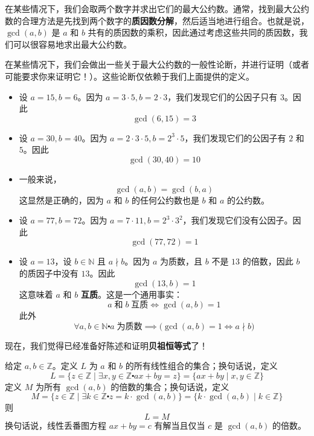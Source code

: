\begin{example}
    在某些情况下，我们会取两个数字并求出它们的最大公约数。通常，找到最大公约数的合理方法是先找到两个数字的\textbf{质因数分解}，然后适当地进行组合。也就是说，$\gcd(a, b)$ 是 $a$ 和 $b$ 共有的质因数的乘积，因此通过考虑这些共同的质因数，我们可以很容易地求出最大公约数。

    在某些情况下，我们会做出一些关于最大公约数的一般性论断，并进行证明（或者可能要求你来证明它！）。这些论断仅依赖于我们上面提供的定义。

    \begin{itemize}
        \item 设 $a=15, b=6$。因为 $a = 3 \cdot 5, b = 2 \cdot 3$，我们发现它们的公因子只有 $3$。因此
            \[\gcd(6, 15) = 3\]
        \item 设 $a=30, b=40$。因为 $a = 2 \cdot 3 \cdot 5, b = 2^3 \cdot 5$，我们发现它们的公因子有 $2$ 和 $5$。因此
            \[\gcd(30, 40) = 10\]
        \item 一般来说，
            \[\gcd(a, b) = \gcd(b, a)\]
            这显然是正确的，因为 $a$ 和 $b$ 的任何公约数也是 $b$ 和 $a$ 的公约数。
        \item 设 $a=77, b=72$。因为 $a = 7 \cdot 11, b = 2^3 \cdot 3^2$，我们发现它们没有公因子。因此
            \[\gcd(77, 72) = 1\]
        \item 设 $a=13$，设 $b \in \mathbb{N}$ 且 $a \nmid b$。因为 $a$ 为质数，且 $b$ 不是 $13$ 的倍数，因此 $b$ 的质因子中没有 $13$。因此
            \[\gcd(13, b) = 1\]
            这意味着 $a$ 和 $b$ \textbf{互质}。这是一个通用事实：
            \[a \;\text{和}\; b \;\text{互质} \iff \gcd(a, b) = 1\]
            此外
            \[\forall a, b \in \mathbb{N} \centerdot a \;\text{为质数} \implies \big(\gcd(a,b)=1 \iff a \nmid b\big)\]
    \end{itemize}
\end{example}

现在，我们觉得已经准备好陈述和证明\textbf{贝祖恒等式}了！

\begin{theorem}[贝祖恒等式]\label{theorem6.5.31}
   给定 $a, b \in \mathbb{Z}$。定义 $L$ 为 $a$ 和 $b$ 的所有线性组合的集合；换句话说，定义
   \[L = \{z \in \mathbb{Z} \mid \exists x, y \in \mathbb{Z} \centerdot ax + by = z\} = \{ax + by \mid x, y \in \mathbb{Z}\}\]
   定义 $M$ 为所有 $\gcd(a, b)$ 的倍数的集合；换句话说，定义
   \[M = \{z \in \mathbb{Z} \mid \exists k \in \mathbb{Z} \centerdot z = k \cdot \gcd(a, b)\} = \{k \cdot \gcd(a, b) \mid k \in \mathbb{Z}\}\]
   则
   \[L = M\]
   换句话说，线性丢番图方程 $ax + by = c$ 有解当且仅当 $c$ 是 $\gcd(a, b)$ 的倍数。
\end{theorem}

